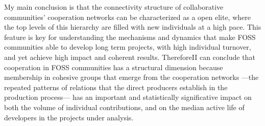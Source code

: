 My main conclusion is that the connectivity structure of collaborative communities' cooperation networks can be characterized as a open elite, where the top levels of this hierarchy are filled with new individuals at a high pace. This feature is key for understanding the mechanisms and dynamics that make FOSS communities able to develop long term projects, with high individual turnover, and yet achieve high impact and coherent results. ThereforeII can conclude that cooperation in FOSS communities has a structural dimension because membership in cohesive groups that emerge from the cooperation networks ---the repeated patterns of relations that the direct producers establish in the production process--- has an important and statistically significative impact on both the volume of individual contributions, and on the median active life of developers in the projects under analysis.
